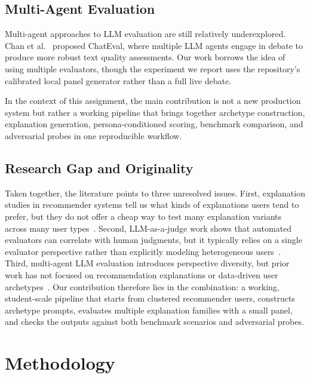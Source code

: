 \documentclass[sigconf,nonacm]{acmart}
\begin{document}
\subsection{Multi-Agent Evaluation}

Multi-agent approaches to LLM evaluation are still relatively underexplored. Chan et al.~\cite{chan2023chateval} proposed ChatEval, where multiple LLM agents engage in debate to produce more robust text quality assessments. Our work borrows the idea of using multiple evaluators, though the experiment we report uses the repository's calibrated local panel generator rather than a full live debate.

In the context of this assignment, the main contribution is not a new production system but rather a working pipeline that brings together archetype construction, explanation generation, persona-conditioned scoring, benchmark comparison, and adversarial probes in one reproducible workflow.

\subsection{Research Gap and Originality}

Taken together, the literature points to three unresolved issues. First, explanation studies in recommender systems tell us what kinds of explanations users tend to prefer, but they do not offer a cheap way to test many explanation variants across many user types~\cite{tintarev2007survey,kouki2019}. Second, LLM-as-a-judge work shows that automated evaluators can correlate with human judgments, but it typically relies on a single evaluator perspective rather than explicitly modeling heterogeneous users~\cite{zheng2023judging}. Third, multi-agent LLM evaluation introduces perspective diversity, but prior work has not focused on recommendation explanations or data-driven user archetypes~\cite{chan2023chateval}. Our contribution therefore lies in the combination: a working, student-scale pipeline that starts from clustered recommender users, constructs archetype prompts, evaluates multiple explanation families with a small panel, and checks the outputs against both benchmark scenarios and adversarial probes.

\section{Methodology}
\label{sec:methodology}
\end{document}
